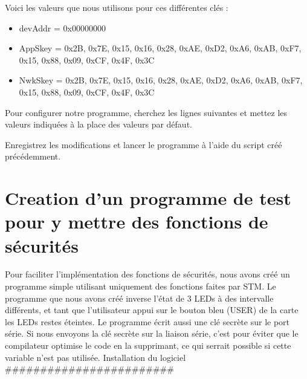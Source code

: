 \documentclass[letterpaper,10pt,french]{sphinxmanual}
\begin{document}
Voici les valeurs que nous utilisons pour ces différentes clés :
\begin{itemize}
\item {} 
devAddr  =  0x00000000

\item {} 
AppSkey  =  0x2B, 0x7E, 0x15, 0x16, 0x28, 0xAE, 0xD2, 0xA6, 0xAB, 0xF7, 0x15, 0x88, 0x09, 0xCF, 0x4F, 0x3C

\item {} 
NwkSkey  =   0x2B, 0x7E, 0x15, 0x16, 0x28, 0xAE, 0xD2, 0xA6, 0xAB, 0xF7, 0x15, 0x88, 0x09, 0xCF, 0x4F, 0x3C

\end{itemize}

Pour configurer notre programme, cherchez les lignes suivantes et mettez les valeurs indiquées à la place des valeurs par défaut.

\begin{sphinxVerbatim}[commandchars=\\\{\}]
\end{sphinxVerbatim}

Enregistrez les modifications et lancer le programme à l’aide du script créé précédemment.


\chapter{Creation d’un programme de test pour y mettre des fonctions de sécurités}
\label{\detokenize{creationPrgpourFctdeSEc:creation-d-un-programme-de-test-pour-y-mettre-des-fonctions-de-securites}}\label{\detokenize{creationPrgpourFctdeSEc::doc}}
Pour faciliter l’implémentation des fonctions de sécurités, nous avons créé un programme simple utilisant uniquement des fonctions faites par STM.
Le programme que nous avons créé inverse l’état de 3 LEDs à des intervalle différents, et tant que l’utilisateur appui sur le bouton bleu (USER) de la carte les LEDs restes éteintes. Le programme écrit aussi une clé secrète sur le port série.
Si nous envoyons la clé secrète sur la liaison série, c’est pour éviter que le compilateur optimise le code en la supprimant, ce qui serrait possible si cette variable n’est pas utilisée.
Installation du logiciel
\#\#\#\#\#\#\#\#\#\#\#\#\#\#\#\#\#\#\#\#\#\#\#\#
\end{document}
